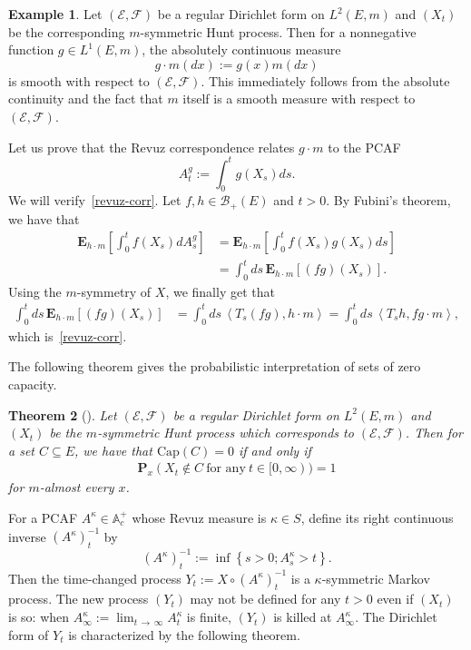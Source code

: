 \documentclass[10pt]{amsart}
\newtheorem{theo}{Theorem}[section]
\theoremstyle{definition}\newtheorem{defi}[theo]{Definition}\newtheorem{rema}[theo]{Remark}\newtheorem{exam}[theo]{Example}\newtheorem{exem}[theo]{Example}\newtheorem{nota}[theo]{Notation}
\newcommand{\ce}{\mathcal{E}}
\newcommand{\cf}{\mathcal{F}}
\newcommand{\cb}{\mathcal{B}}
\newcommand{\ba}{\mathbb{A}}
\newcommand{\bfE}{\mathbf{E}}
\newcommand{\bfP}{\mathbf{P}}
\newcommand{\Capp}{\mathrm{Cap}}
\begin{document}
\begin{exem}\label{abs-pcaf}
Let $(\ce,\cf)$ be a regular Dirichlet form on $L^2(E,m)$ and $(X_t)$ be the corresponding $m$-symmetric Hunt process. Then for a nonnegative function $g\in L^1(E,m)$, the absolutely continuous measure
\[
g\cdot m(dx):=g(x)m(dx)
\]
is smooth with respect to $(\ce,\cf)$. This immediately follows from the absolute continuity and the fact that $m$ itself is a smooth measure with respect to $(\ce,\cf)$.

Let us prove that the Revuz correspondence relates $g\cdot m$ to the PCAF
\[
A^g_t:=\int_0^t g(X_s)ds.
\]
We will verify~\eqref{revuz-corr}. Let $f,h\in\cb_+(E)$ and $t>0$. By Fubini's theorem, we have that
\begin{align*}
\bfE_{h\cdot m}\left[\int_0^{t}f(X_s)dA^g_s\right]&= \bfE_{h\cdot m} \left[\int_0^t f(X_s)g(X_s)ds\right]\\
&=\int_0^t ds\, \bfE_{h\cdot m}\left[(fg)(X_s)\right].
\end{align*}
Using the $m$-symmetry of $X$, we finally get that
\begin{align*}
\int_0^t ds\, \bfE_{h\cdot m}\left[(fg)(X_s)\right]&=\int_0^t ds\, \left\langle T_s(fg), h\cdot m\right\rangle =\int_0^t ds\, \left\langle T_sh, fg\cdot m\right\rangle,
\end{align*}
which is~\eqref{revuz-corr}.
\end{exem}

The following theorem gives the probabilistic interpretation of sets of zero capacity.

\begin{theo}[{\cite[Theorem~4.2.1]{FOT}}]
Let $(\ce,\cf)$ be a regular Dirichlet form on $L^2(E,m)$ and $(X_t)$ be the $m$-symmetric Hunt process which corresponds to $(\ce,\cf)$. Then for a set $C\subseteq E$, we have that $\Capp(C)=0$ if and only if
\begin{align*}
\bfP_x(X_t\notin C \ \text{for\ any}\ t\in[0,\infty))=1
\end{align*}
for $m$-almost every $x$.
\end{theo}

For a PCAF $A^{\kappa}\in\ba_c^+$ whose Revuz measure is $\kappa\in S$, define its right continuous inverse $(A^{\kappa})^{-1}_t$ by
\[
(A^{\kappa})^{-1}_t:=\inf\left\{s>0; A_s^{\kappa}>t\right\}.
\]
Then the time-changed process $Y_t:=X\circ (A^{\kappa})^{-1}_t$ is a $\kappa$-symmetric Markov process. The new process $(Y_t)$ may not be defined for any $t>0$ even if $(X_t)$ is so: when $A^{\kappa}_{\infty}:=\lim_{t\,\to\,\infty}A^{\kappa}_t$ is finite, $(Y_t)$ is killed at $A^{\kappa}_{\infty}$. The Dirichlet form of $Y_t$ is characterized by the following theorem.
\end{document}
